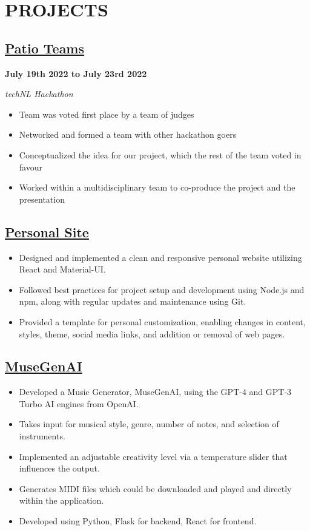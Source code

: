 \documentclass[12pt]{extarticle}
\begin{document}
\section*{PROJECTS}
\subsection*{\href{https://technl.ca/2022/07/28/techfwd-conclusion/}{Patio Teams}
} \hfill \textbf{July 19th 2022 to July 23rd 2022}

\textsl{techNL Hackathon}
\begin{itemize}
	\item Team was voted first place by a team of judges
  \item Networked and formed a team with other hackathon goers
  \item Conceptualized the idea for our project, which the rest of the team voted in favour
  \item Worked within a multidisciplinary team to co-produce the project and the presentation
\end{itemize}



\subsection*{\href{https://github.com/Inefy/Me}{Personal Site}
} \hfill
\begin{itemize}
\item Designed and implemented a clean and responsive personal website utilizing React and Material-UI.
\item Followed best practices for project setup and development using Node.js and npm, along with regular updates and maintenance using Git.
\item Provided a template for personal customization, enabling changes in content, styles, theme, social media links, and addition or removal of web pages.
\end{itemize}

\subsection*{\href{https://github.com/Inefy/MuseGenAI}{MuseGenAI}
} \hfill
\begin{itemize}
	\item Developed a Music Generator, MuseGenAI, using the GPT-4 and GPT-3 Turbo AI engines from OpenAI.
	\item Takes input for musical style, genre, number of notes, and selection of instruments.
	\item Implemented an adjustable creativity level via a temperature slider that influences the output.
	\item Generates MIDI files which could be downloaded and played and directly within the application.
	\item Developed using Python, Flask for backend, React for frontend.
\end{itemize}
\end{document}
